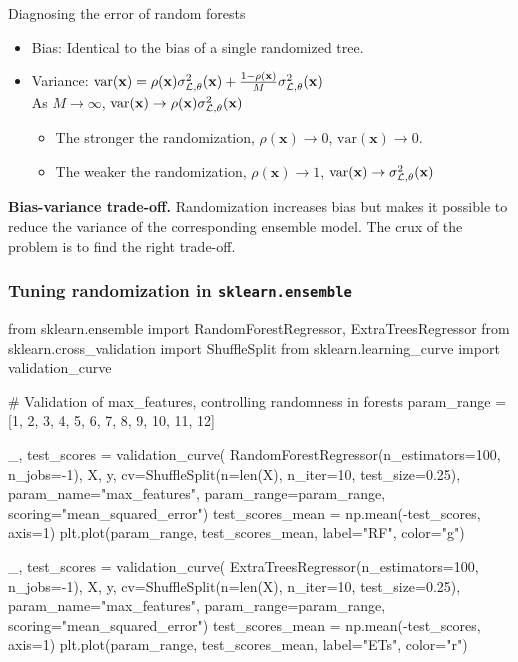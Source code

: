 \documentclass{beamer}
\begin{document}
\begin{frame}{Diagnosing the error of random forests \citep{louppe2014understanding}}

\begin{itemize}
\item Bias: {\color{blue} Identical} to the bias of a single randomized tree.
\item Variance: $\text{var}(\mathbf{x}) = \rho(\mathbf{x}) \sigma^2_{{\cal L},\theta}(\mathbf{x}) + \frac{1 - \rho(\mathbf{x})}{M} \sigma^2_{{\cal L},\theta}(\mathbf{x})$\\
As $M \to \infty$, {\color{red} $\text{var}(\mathbf{x}) \to \rho(\mathbf{x}) \sigma^2_{{\cal L},\theta}(\mathbf{x})$}
  \begin{itemize}
    \item The stronger the randomization, $\rho(\mathbf{x}) \to 0$, $\text{var}(\mathbf{x}) \to 0$.
    \item The weaker the randomization, $\rho(\mathbf{x}) \to 1$, $\text{var}(\mathbf{x}) \to \sigma^2_{{\cal L},\theta}(\mathbf{x})$
  \end{itemize}
\end{itemize}

\vspace{1cm}

{\bf Bias-variance trade-off.} Randomization increases bias but makes it
possible to reduce the variance of the corresponding ensemble model. The crux
of the problem is to {\color{red} find the right trade-off}.

\end{frame}


\begin{frame}[fragile]
\frametitle{Tuning randomization in \texttt{sklearn.ensemble}}

{\scriptsize
\begin{pythoncode}
from sklearn.ensemble import RandomForestRegressor, ExtraTreesRegressor
from sklearn.cross_validation import ShuffleSplit
from sklearn.learning_curve import validation_curve

# Validation of max_features, controlling randomness in forests
param_range = [1, 2, 3, 4, 5, 6, 7, 8, 9, 10, 11, 12]

_, test_scores = validation_curve(
    RandomForestRegressor(n_estimators=100, n_jobs=-1), X, y,
    cv=ShuffleSplit(n=len(X), n_iter=10, test_size=0.25),
    param_name="max_features", param_range=param_range,
    scoring="mean_squared_error")
test_scores_mean = np.mean(-test_scores, axis=1)
plt.plot(param_range, test_scores_mean, label="RF", color="g")

_, test_scores = validation_curve(
    ExtraTreesRegressor(n_estimators=100, n_jobs=-1), X, y,
    cv=ShuffleSplit(n=len(X), n_iter=10, test_size=0.25),
    param_name="max_features", param_range=param_range,
    scoring="mean_squared_error")
test_scores_mean = np.mean(-test_scores, axis=1)
plt.plot(param_range, test_scores_mean, label="ETs", color="r")
\end{pythoncode}
}
\end{frame}
\end{document}
